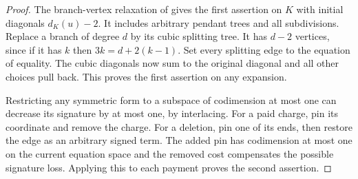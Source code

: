 \documentclass[11pt]{article}
\begin{document}
\begin{proof}
The branch-vertex relaxation of \cite[Lemma 3.1]{prev} gives the first assertion on $K$ with initial diagonals $d_K(u)-2$. It includes arbitrary pendant trees and all subdivisions. Replace a branch of degree $d$ by its cubic splitting tree. It has $d-2$ vertices, since if it has $k$ then $3k=d+2(k-1)$. Set every splitting edge to the equation of equality. The cubic diagonals now sum to the original diagonal and all other choices pull back. This proves the first assertion on any expansion.

Restricting any symmetric form to a subspace of codimension at most one can decrease its signature by at most one, by interlacing. For a paid charge, pin its coordinate and remove the charge. For a deletion, pin one of its ends, then restore the edge as an arbitrary signed term. The added pin has codimension at most one on the current equation space and the removed cost compensates the possible signature loss. Applying this to each payment proves the second assertion.
\end{proof}
\end{document}
